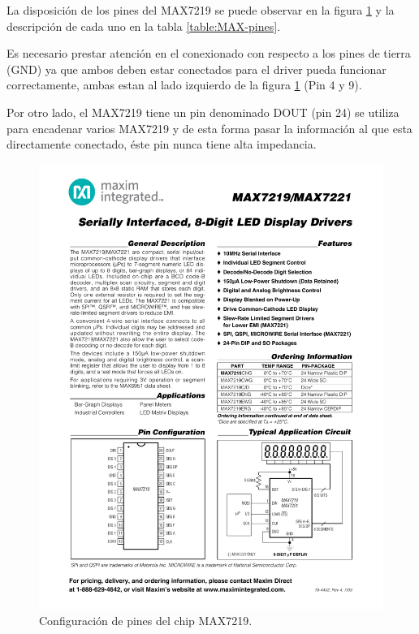 La disposición de los pines del MAX7219 se puede observar en la figura \ref{fig:MAX-pines} y la descripción de cada uno en la tabla \ref{table:MAX-pines}.

Es necesario prestar atención en el conexionado con respecto a los pines de tierra (GND) ya que ambos deben estar conectados para el driver pueda funcionar correctamente, ambas estan al lado izquierdo de la figura \ref{fig:MAX-pines} (Pin 4 y 9).

Por otro lado, el MAX7219 tiene un pin denominado DOUT (pin 24) se utiliza para encadenar varios MAX7219 y de esta forma pasar la información al que esta directamente conectado, éste pin nunca tiene alta impedancia.

\begin{figure}[htp!]
	\centering
	\begin{center}
	\includegraphics[scale=1.2]{imagenes/hw/max.pdf}
	 \caption{Configuración de pines del chip MAX7219.}
	  \label{fig:MAX-pines}
	\end{center}
\end{figure}


